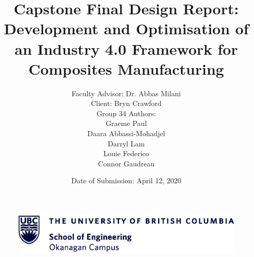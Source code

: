 \documentclass{article}
\begin{document}
\begin{figure}
\vspace{-2cm}
\hspace{-2cm}
\includegraphics[width=\linewidth]{ubc_logo_ENG.eps}
\end{figure}

\linespread{1.3}\selectfont

\title{\bfseries{Capstone Final Design Report:\\Development and Optimisation of an Industry 4.0 Framework for Composites Manufacturing} \vspace{1cm}} 

\author{
\LARGE Faculty Advisor: Dr. Abbas Milani \\
\LARGE Client: Bryn Crawford \vspace{3cm}\\ 
\Large Group 34 Authors: \\ 
\Large Graeme Paul\\
\Large Daara Abbassi-Mohadjel\\
\Large Darryl Lam\\
\Large Louie Federico\\
\Large Connor Gaudreau\\ 
}

\date{\vspace{5cm} \Large Date of Submission: April 12, 2020} 

\maketitle
\thispagestyle{empty}
\newpage

\tableofcontents
\clearpage

\begingroup
\linespread{1.3}\selectfont
\listoffigures
{}
\endgroup
\clearpage

\setlength{\parskip}{1em}
\setlength{\parindent}{0pt}

\linespread{1.3}\selectfont


\end{document}
